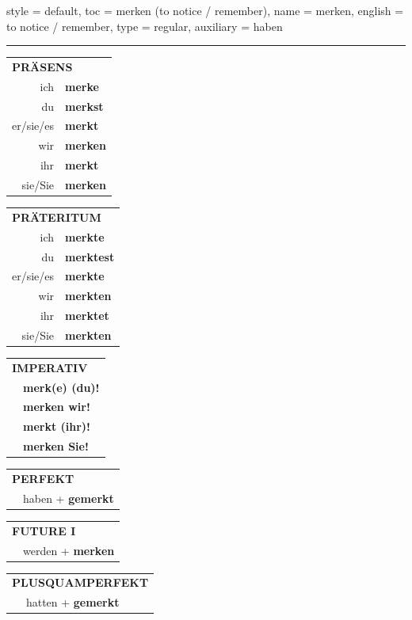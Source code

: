 \begin{verbentry}{
  style = {default},
  toc = {merken (to notice / remember)},
  name = {merken},
  english = {to notice / remember},
  type = {regular},
  auxiliary = {haben}
}


\vspace{5pt}
\hrule
\vspace{5pt}

\begin{tabular}{rl}
\multicolumn{2}{l}{\textbf{PRÄSENS}}\\
ich & \textbf{merke}\\
du & \textbf{merkst}\\
er/sie/es & \textbf{merkt}\\
wir & \textbf{merken}\\
ihr & \textbf{merkt}\\
sie/Sie & \textbf{merken}\\
\end{tabular}
\hfill
\begin{tabular}{rl}
\multicolumn{2}{l}{\textbf{PRÄTERITUM}}\\
ich & \textbf{merkte}\\
du & \textbf{merktest}\\
er/sie/es & \textbf{merkte}\\
wir & \textbf{merkten}\\
ihr & \textbf{merktet}\\
sie/Sie & \textbf{merkten}\\
\end{tabular}
\hfill
\begin{tabular}{rl}
\multicolumn{2}{l}{\textbf{IMPERATIV}}\\
& \textbf{merk(e) (du)!}\\
& \textbf{merken wir!}\\
& \textbf{merkt (ihr)!}\\
& \textbf{merken Sie!}\\
\end{tabular}

\vspace{10pt}

\begin{tabular}{rl}
\multicolumn{2}{l}{\textbf{PERFEKT}}\\
& haben + \textbf{gemerkt}\\
\end{tabular}
\hfill
\begin{tabular}{rl}
\multicolumn{2}{l}{\textbf{FUTURE I}}\\
& werden + \textbf{merken}\\
\end{tabular}
\hfill
\begin{tabular}{rl}
\multicolumn{2}{l}{\textbf{PLUSQUAMPERFEKT}}\\
& hatten + \textbf{gemerkt}\\
\end{tabular}


\end{verbentry}
